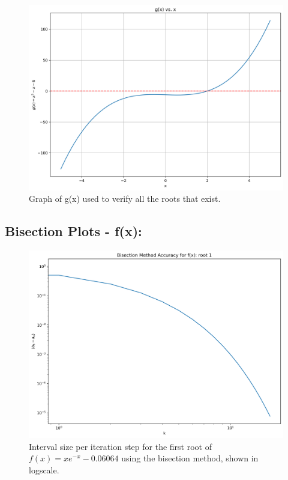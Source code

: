 \documentclass[11pt]{article}
\begin{document}
\begin{figure}[H]
	\centering
	\includegraphics[width=\linewidth]{../figures/g(x)}
	\caption{Graph of g(x) used to verify all the roots that exist.}
	\label{fig:g(x)}
\end{figure}

\subsection{Bisection Plots - f(x):}

\begin{figure}[H]
	\centering
	\includegraphics[width=\linewidth]{../figures/Bisection_f_root1}
	\caption{Interval size per iteration step for the first root of $f(x) = xe^{-x} - 0.06064$ using the bisection method, shown in logscale.}
	\label{fig:bisec_f1}
\end{figure}
\end{document}
